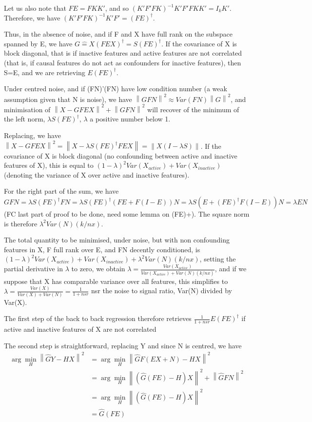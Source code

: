 \documentclass{article}
\begin{document}
Let us also note that $FE=FKK'$, and so $(K'F'FK)^{-1} K'F'FKK'=I_{k}K'$. Therefore, we have $(K'F'FK)^{-1} K'F'=(FE)^\dagger$.

Thus, in the absence of noise, and if F and X have full rank on the subspace spanned by E, we have $G\hat=X(FEX)^\dagger =S (FE)^\dagger$. If the covariance of X is block diagonal, that is if inactive features and active features are not correlated (that is, if causal features do not act as confounders for inactive features), then S=E, and we are retrieving $E (FE)^\dagger$.

Under centred noise, and if (FN)'(FN) have low condition number (a weak assumption given that N is noise), we have $\left \| GFN\right \| ^2 \approx Var(FN) \left \| G\right \| ^2$, and minimisation of $\left \| X-GFEX\right\| ^2  + \left \| GFN\right \| ^2$ will recover of the minimum of the left norm, $\lambda S (FE)^\dagger$, $\lambda$ a positive number below 1. 

Replacing, we have $\left \| X-GFEX\right\| ^2 = \left \| X-\lambda S (FE)^\dagger FEX\right\| = \left \| X(I-\lambda S)\right\|$. If the covariance of X is block diagonal (no confounding between active and inactive features of X), this is equal to $(1-\lambda)^2 Var(X_{active}) + Var(X_{inactive})$ (denoting the variance of X over active and inactive features). 

For the right part of the sum, we have $GFN=\lambda S (FE)^\dagger FN= \lambda S (FE)^\dagger (FE+F(I-E))N= \lambda S (E +(FE)^\dagger F(I-E))N=\lambda E N $ (FC last part of proof to be done, need some lemma on (FE)+). The square norm is therefore $\lambda^2 Var(N) (k/nx)$.

The total quantity to be minimised, under noise, but with non confounding features in X, F full rank over E, and FN decently conditioned, is $(1-\lambda)^2 Var(X_{active}) + Var(X_{inactive})+\lambda^2 Var(N) (k/nx)$, setting the partial derivative in $\lambda$ to zero, we obtain $\lambda = \frac{Var(X_{active})}{Var(X_{active})+Var(N) (k/nx)}$, and if we suppose that X has comparable variance over all features, this simplifies to $\lambda= \frac {Var(X)}{Var(X)+ Var(N)}=\frac{1}{1+nsr}$ nsr the noise to signal ratio, Var(N) divided by Var(X).

The first step of the back to back regression therefore retrieves $\frac{1}{1+nsr} E (FE)^\dagger$ if active and inactive features of X are not correlated

The second step is straightforward, replacing Y and since N is centred, we have
\begin{equation}
\begin{aligned}
\arg \min_H \left \| \hat GY - HX \right \|^2 &=\arg  \min_H \left \| \hat GF(EX+N) - HX \right \|^2 \\
&=\arg \min_H \left \| (\hat G(FE)-H)X \right \| ^2 + \left \| \hat GFN \right \| ^2\\
&= \arg \min_H \left \| (\hat G(FE)-H)X \right \| ^2\\
&=\hat G (FE)
\end{aligned}
\end{equation}
\end{document}
